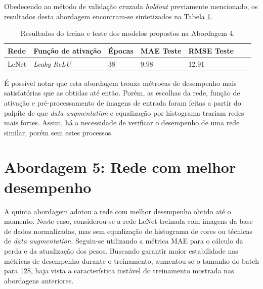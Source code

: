 	Obedecendo ao método de validação cruzada \emph{holdout} previamente mencionado, os resultados desta abordagem encontram-se sintetizados na Tabela \ref{tab:results-4}.

	\begin{table}[!ht]
		\centering
		\caption{Resultados do treino e teste dos modelos propostos na Abordagem 4.}
		\label{tab:results-4}
			\begin{tabular}{l l l l l l l}
				\toprule
				Rede & Função de ativação & Épocas & MAE Teste & RMSE Teste \\
				\midrule
				LeNet & \emph{Leaky ReLU} & 38 & 9.98 & 12.91 \\
				\bottomrule
			\end{tabular}
	\end{table}

	É possível notar que esta abordagem trouxe métrocas de desempenho mais satisfatórias que as obtidas até então. Porém, as escolhas da rede, função de ativação e pré-processamento de imagens de entrada foram feitas a partir do palpite de que \emph{data augmentation} e equalização por histograma trariam redes mais fortes. Assim, há a necessidade de verificar o desempenho de uma rede similar, porém sem estes processos.

\section{Abordagem 5: Rede com melhor desempenho}%
	A quinta abordagem adotou a rede com melhor desempenho obtido até o momento. Neste caso, considerou-se a rede LeNet treinada com imagens da base de dados normalizadas, mas sem equalização de histograma de cores ou técnicas de \emph{data augmentation}. Seguiu-se utilizando a métrica MAE para o cálculo da perda e da atualização dos pesos. Buscando garantir maior estabilidade nas métricas de desempenho durante o treinamento, aumentou-se o tamanho do batch para 128, haja vista a característica instável do treinamento mostrada nas abordagens anteriores.

